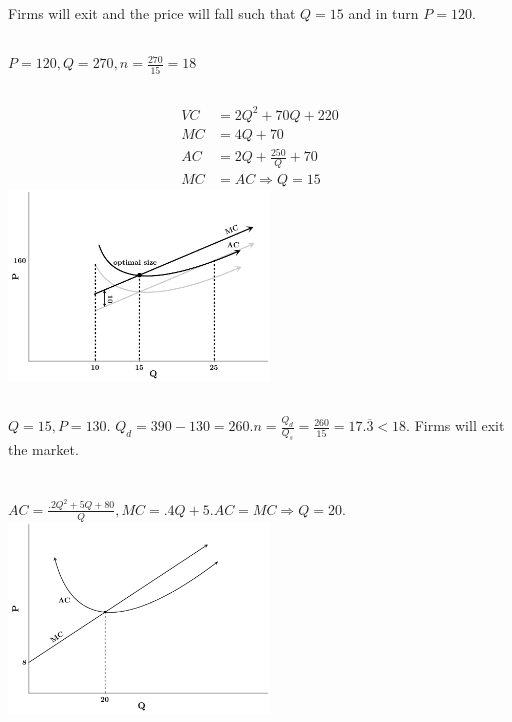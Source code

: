 \documentclass{article}
\begin{document}
	\subsection[e]{}
		Firms will exit and the price will fall such that $Q=15$ and in turn $P=120.$
	\subsection[f]{}
		$P=120, Q=270, n=\frac{270}{15} = 18$
	\subsection[g]{}
		\begin{align*}
			VC &= 2 Q^2+70 Q+220\\
			MC &= 4Q+70 \\
			AC &= 2 Q+\frac{250}{Q}+70 \\
			MC &= AC \Rightarrow Q = 15									
		 \end{align*}
		\includegraphics[height=2in]{Charts/5g}	
	\subsection[h]{}
		$Q=15, P=130$. $Q_d = 390-130=260. n=\frac{Q_d}{Q_s} = \frac{260}{15} = 17.\overline{3} < 18.$ Firms will exit the market. 
\section[6]{}
	\subsection[a]{}
		$ AC = \frac{.2Q^2+5Q+80}{Q}, MC = .4Q+5. AC = MC \Rightarrow Q=20. $ \\
		\includegraphics[height=2in]{Charts/6a}
\end{document}
